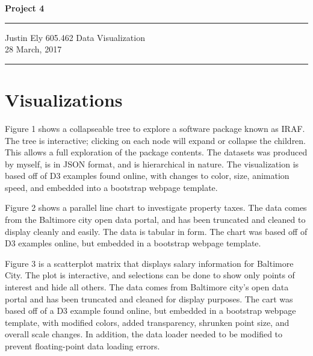 \documentclass[a4paper,11pt]{article}
\begin{document}
\begin{flushright}

\vspace{1.1cm}

{\bf\Huge Project 4}

\rule{0.25\linewidth}{0.5pt}

\vspace{0.5cm}
Justin Ely
\linebreak
\newline
\footnotesize{605.462 Data Visualization \\}
\vspace{0.5cm}
28 March, 2017
\end{flushright}

\noindent\rule{\linewidth}{1.0pt}


\section{Visualizations}
Figure 1 shows a collapseable tree to explore a software package known as IRAF.  The tree is interactive; clicking on each node will expand or collapse the children.  This allows a full exploration of the package contents.  The datasets was produced by myself, is in JSON format, and is hierarchical in nature.  The visualization is based off of D3 examples found online, with changes to color, size, animation speed, and embedded into a bootstrap webpage template.

Figure 2 shows a parallel line chart to investigate property taxes.  The data comes from the Baltimore city open data portal, and has been truncated and cleaned to display cleanly and easily.  The data is tabular in form.  The chart was based off of D3 examples online, but embedded in a bootstrap webpage template.  

Figure 3 is a scatterplot matrix that displays salary information for Baltimore City.  The plot is interactive, and selections can be done to show only points of interest and hide all others.  The data comes from Baltimore city's open data portal and has been truncated and cleaned for display purposes.  The cart was based off of a D3 example found online, but embedded in a bootstrap webpage template, with modified colors, added transparency, shrunken point size, and overall scale changes.  In addition, the data loader needed to be modified to prevent floating-point data loading errors.  
\end{document}
